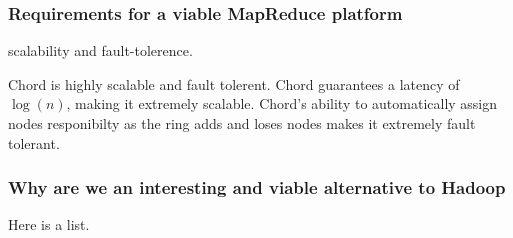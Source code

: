 \documentclass[conference, compsocconf, letterpaper]{IEEEtran}
\begin{document}
\subsubsection{Requirements for a viable MapReduce platform}
scalability and fault-tolerence.

Chord is highly scalable and fault tolerent.  Chord guarantees a latency of $\log(n)$, making it extremely scalable.  Chord's ability to automatically assign nodes responibilty as the ring adds and loses nodes makes it extremely fault tolerant.  



\subsubsection{Why are we an interesting and viable alternative to Hadoop}

Here is a list.
\end{document}
